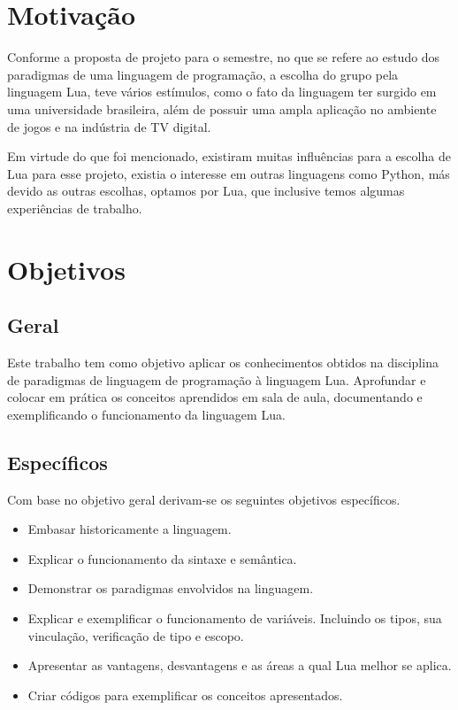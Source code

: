 \documentclass[
12pt, %
openright, %
oneside, %
a4paper, %
english, %
brazil, %
]{abntex2}
\begin{document}
\section{Motivação}
Conforme a proposta de projeto para o semestre, no que se refere ao estudo dos paradigmas de uma linguagem de programação, a escolha do grupo pela linguagem Lua, teve vários estímulos, como o fato da linguagem ter surgido em uma universidade brasileira, além de possuir uma ampla aplicação no ambiente de jogos e na indústria de TV digital.

Em virtude do que foi mencionado, existiram muitas influências para a escolha de Lua para esse projeto, existia o interesse em outras linguagens como Python, más devido as outras escolhas, optamos por Lua, que inclusive temos algumas experiências de trabalho.

\section{Objetivos}

\subsection{Geral}
Este trabalho tem como objetivo aplicar os conhecimentos obtidos na disciplina de paradigmas de linguagem de programação à linguagem Lua. Aprofundar e colocar em prática os conceitos aprendidos em sala de aula, documentando e exemplificando o funcionamento da linguagem Lua.

\subsection{Específicos}
Com base no objetivo geral derivam-se os seguintes objetivos específicos.
\begin{itemize}
\item Embasar historicamente a linguagem.
\item Explicar o funcionamento da sintaxe e semântica.
\item Demonstrar os paradigmas envolvidos na linguagem.
\item Explicar e exemplificar o funcionamento de variáveis. Incluindo os tipos, sua vinculação, verificação de tipo e escopo.
\item Apresentar as vantagens, desvantagens e as áreas a qual Lua melhor se aplica.
\item Criar códigos para exemplificar os conceitos apresentados.
\end{itemize}
\end{document}
